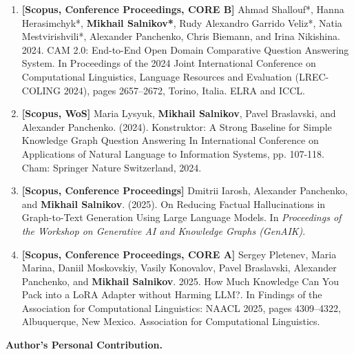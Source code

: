 \begin{enumerate}
    \item \textbf{[Scopus, Conference Proceedings, CORE B]} Ahmad Shallouf*, Hanna Herasimchyk*, \textbf{Mikhail Salnikov*}, Rudy Alexandro Garrido Veliz*, Natia Mestvirishvili*, Alexander Panchenko, Chris Biemann, and Irina Nikishina. 2024. CAM 2.0: End-to-End Open Domain Comparative Question Answering System. In Proceedings of the 2024 Joint International Conference on Computational Linguistics, Language Resources and Evaluation (LREC-COLING 2024), pages 2657–2672, Torino, Italia. ELRA and ICCL.
    \item \textbf{[Scopus, WoS]} Maria Lysyuk, \textbf{Mikhail Salnikov}, Pavel Braslavski, and Alexander Panchenko. (2024). Konstruktor: A Strong Baseline for Simple Knowledge Graph Question Answering In International Conference on Applications of Natural Language to Information Systems, pp. 107-118. Cham: Springer Nature Switzerland, 2024.
    \item \textbf{[Scopus, Conference Proceedings]} Dmitrii Iarosh, Alexander Panchenko, and \textbf{Mikhail Salnikov}. (2025). On Reducing Factual Hallucinations in Graph-to-Text Generation Using Large Language Models. In \textit{Proceedings of the Workshop on Generative AI and Knowledge Graphs (GenAIK)}.
    \item \textbf{[Scopus, Conference Proceedings, CORE A]} Sergey Pletenev, Maria Marina, Daniil Moskovskiy, Vasily Konovalov, Pavel Braslavski, Alexander Panchenko, and \textbf{Mikhail Salnikov}. 2025. How Much Knowledge Can You Pack into a LoRA Adapter without Harming LLM?. In Findings of the Association for Computational Linguistics: NAACL 2025, pages 4309–4322, Albuquerque, New Mexico. Association for Computational Linguistics.
\end{enumerate}

\textbf{Author's Personal Contribution.}

